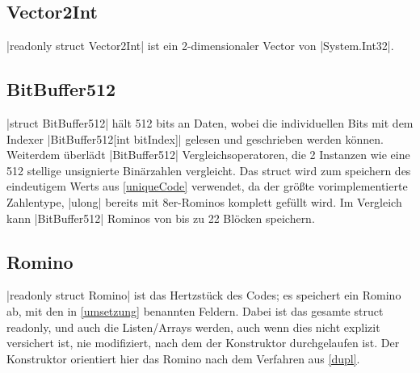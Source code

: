 \documentclass[a4paper,10pt,ngerman]{scrartcl}
\begin{document}
\subsection{Vector2Int}

|readonly struct Vector2Int| ist ein 2-dimensionaler Vector von
|System.Int32|.

\subsection{BitBuffer512}

|struct BitBuffer512| hält 512 bits an Daten,
wobei die individuellen Bits mit dem Indexer
|BitBuffer512[int bitIndex]| gelesen und geschrieben
werden können. Weiterdem überlädt |BitBuffer512|
Vergleichsoperatoren, die 2 Instanzen wie eine 512 stellige
unsignierte Binärzahlen vergleicht.
Das struct wird zum speichern des eindeutigem Werts aus
\cref{uniqueCode} verwendet, da der größte vorimplementierte
Zahlentype, |ulong| bereits mit 8er-Rominos komplett
gefüllt wird. Im Vergleich kann |BitBuffer512|
Rominos von bis zu 22 Blöcken speichern.

\subsection{Romino}

|readonly struct Romino| ist das Hertzstück des Codes; es speichert ein Romino ab,
mit den in \cref{umsetzung} benannten Feldern. Dabei ist das gesamte struct
readonly, und auch die Listen/Arrays werden, auch wenn dies nicht explizit
versichert ist, nie modifiziert, nach dem der Konstruktor durchgelaufen ist.
Der Konstruktor orientiert hier das Romino nach dem Verfahren aus \cref{dupl}.
\end{document}
